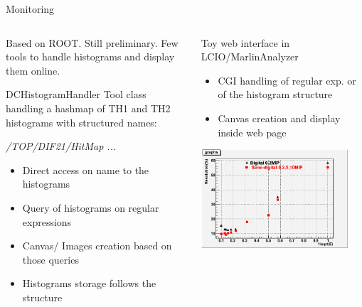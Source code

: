 \begin{frame}[shrink=5]{Monitoring}

  \begin{columns}
    \begin{column}{0.5\textwidth}
      \par
      Based on ROOT. Still preliminary. Few tools to handle histograms and display them online.


      \begin{block}{DCHistogramHandler}
        Tool class handling a hashmap of TH1 and TH2 histograms with structured names:
        \par
            {\sl /TOP/DIF21/HitMap ... }
            \begin{itemize}
            \item Direct access on name to the histograms
            \item Query of histograms on regular expressions
            \item Canvas/ Images creation based on those queries
            \item Histograms storage follows the structure
            \end{itemize}


      \end{block}
    \end{column}
    \begin{column}{0.5\textwidth}
      \pause \begin{block}{Toy web interface in LCIO/MarlinAnalyzer}
        \begin{itemize}
        \item CGI handling of regular exp. or of the histogram structure
        \item Canvas creation and display inside web page
        \end{itemize}
      \end{block}

      \centerline{\includegraphics[width=0.9\textwidth]{images/DigitalSemiDigital}}

    \end{column}
  \end{columns}
\end{frame}


